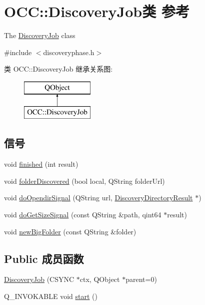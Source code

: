 \hypertarget{class_o_c_c_1_1_discovery_job}{}\section{O\+CC\+:\+:Discovery\+Job类 参考}
\label{class_o_c_c_1_1_discovery_job}


The \hyperlink{class_o_c_c_1_1_discovery_job}{Discovery\+Job} class  




{\ttfamily \#include $<$discoveryphase.\+h$>$}

类 O\+CC\+:\+:Discovery\+Job 继承关系图\+:\begin{figure}[H]
\begin{center}
\leavevmode
\includegraphics[height=2.000000cm]{class_o_c_c_1_1_discovery_job}
\end{center}
\end{figure}
\subsection*{信号}
\begin{DoxyCompactItemize}
\item 
void \hyperlink{class_o_c_c_1_1_discovery_job_a19720e2f4b466f5ddf111459beabe5c4}{finished} (int result)
\item 
void \hyperlink{class_o_c_c_1_1_discovery_job_a07901d17505529ca7cb1a5e225989f13}{folder\+Discovered} (bool local, Q\+String folder\+Url)
\item 
void \hyperlink{class_o_c_c_1_1_discovery_job_a78632645c29d5cd8a00721a850b33ec1}{do\+Opendir\+Signal} (Q\+String url, \hyperlink{struct_o_c_c_1_1_discovery_directory_result}{Discovery\+Directory\+Result} $\ast$)
\item 
void \hyperlink{class_o_c_c_1_1_discovery_job_aa5ad6add45ad5f9f8d4712db09a4ff79}{do\+Get\+Size\+Signal} (const Q\+String \&path, qint64 $\ast$result)
\item 
void \hyperlink{class_o_c_c_1_1_discovery_job_a7c8ebc45eea450b8a3335f939d6b9788}{new\+Big\+Folder} (const Q\+String \&folder)
\end{DoxyCompactItemize}
\subsection*{Public 成员函数}
\begin{DoxyCompactItemize}
\item 
\hyperlink{class_o_c_c_1_1_discovery_job_aa76b2b611b06516e17bd1ee1f55e4af9}{Discovery\+Job} (C\+S\+Y\+NC $\ast$ctx, Q\+Object $\ast$parent=0)
\item 
Q\+\_\+\+I\+N\+V\+O\+K\+A\+B\+LE void \hyperlink{class_o_c_c_1_1_discovery_job_a6cd33ce4e53ad4d05333f56923a2e052}{start} ()
\end{DoxyCompactItemize}
